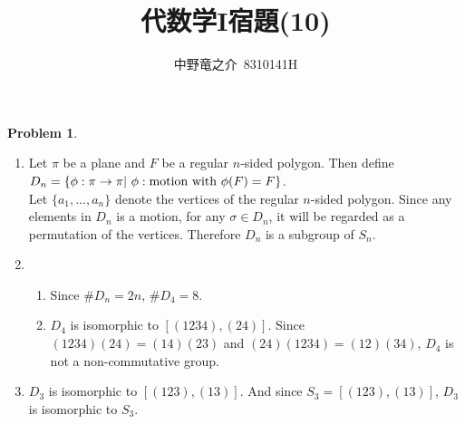 \documentclass[a4paper, 12pt, fleqn]{article}
\title{代数学I宿題(10)}
\author{中野竜之介\ 8310141H}
\theoremstyle{definition}
\newtheorem{prb}{Problem}
\begin{document}
\maketitle

\begin{prb}
    $ $
    \begin{enumerate}

        \item Let $\pi $ be a plane and $F$ be a regular $n$-sided polygon. Then define $D_n = \{\phi :\pi \to \pi |\ \phi : {\rm motion\ with\ }\phi (F) = F\}$.\\
         Let $\{a_1,...,a_n\}$ denote the vertices of the regular $n$-sided polygon. Since any elements in $D_n$ is a motion, for any $\sigma \in D_n$, it will be regarded as a permutation of the vertices. Therefore $D_n$ is a subgroup of $S_n$.

        \item
            \begin{enumerate}
                \item Since $\# D_n = 2n$, $\# D_4 = 8$.
                \item $D_4$ is isomorphic to $[(1234),(24)]$. Since $(1234)(24)=(14)(23)$ and $(24)(1234) = (12)(34)$, $D_4$ is not a non-commutative group.
            \end{enumerate}

        \item $D_3$ is isomorphic to $[(123),(13)]$. And since $S_3 = [(123),(13)]$, $D_3$ is isomorphic to $S_3$.
    \end{enumerate}
\end{prb}
\end{document}

